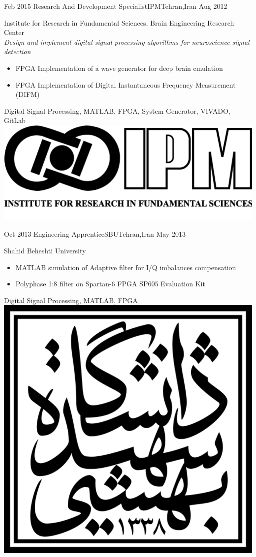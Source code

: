 \begin{experiences}
  \experience
  {Feb 2015} {Research And Development Specialist}{IPM}{Tehran,Iran}
  {Aug 2012} {
    Institute for Research in Fundamental Sciences, Brain Engineering Research Center\\
    \emph{Design and implement digital signal processing algorithms for neuroscience signal detection}
    \begin{itemize}
      \item FPGA Implementation of a wave generator for deep brain emulation
      \item FPGA Implementation of Digital Instantaneous Frequency Measurement (DIFM)
    \end{itemize}
  }
  {Digital Signal Processing, MATLAB, FPGA, System Generator, VIVADO, GitLab}
  {\includegraphics[scale=0.025]{graphics/IPM_logo}}

  \emptySeparator

  \experience
  {Oct 2013} {Engineering Apprentice}{SBU}{Tehran,Iran}
  {May 2013} {
    Shahid Beheshti University
    \begin{itemize}
      \item MATLAB simulation of Adaptive filter for I/Q imbalances compensation
      \item Polyphase 1:8 filter on Spartan-6 FPGA SP605 Evaluation Kit
    \end{itemize}
  }
  {Digital Signal Processing, MATLAB, FPGA}
  {\includegraphics[scale=0.05]{graphics/SBU_logo}}


\end{experiences}
